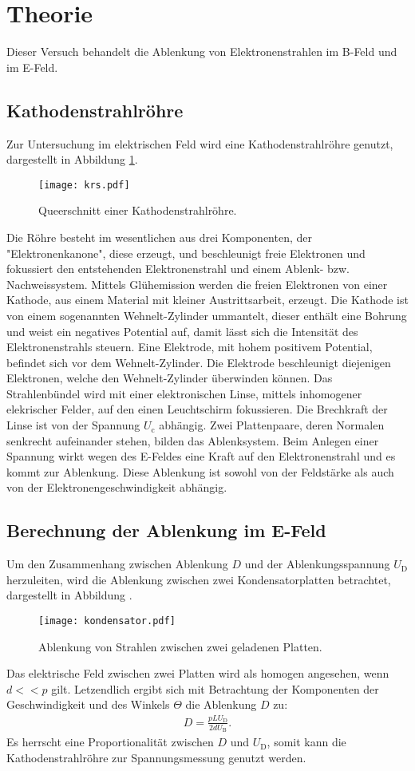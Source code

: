 \section{Theorie}
\label{sec:Theorie}
Dieser Versuch behandelt die Ablenkung von Elektronenstrahlen im B-Feld und
im E-Feld.
\subsection{Kathodenstrahlröhre}
Zur Untersuchung im elektrischen Feld wird eine Kathodenstrahlröhre genutzt,
dargestellt in Abbildung \ref{fig:krs}.
\begin{figure}
 \centering
 \texttt{[image: krs.pdf]}
 \caption{Queerschnitt einer Kathodenstrahlröhre.}
 \label{fig:krs}
\end{figure}
Die Röhre besteht im wesentlichen aus drei Komponenten, der "Elektronenkanone",
diese erzeugt, und beschleunigt freie Elektronen und
fokussiert den entstehenden Elektronenstrahl und einem
Ablenk- bzw. Nachweissystem.
Mittels Glühemission werden die freien Elektronen von einer Kathode, aus
einem Material mit kleiner Austrittsarbeit, erzeugt.
Die Kathode ist von einem sogenannten Wehnelt-Zylinder ummantelt, dieser enthält
eine Bohrung und weist ein negatives Potential auf, damit lässt sich die
Intensität des Elektronenstrahls steuern.
Eine Elektrode, mit hohem positivem Potential, befindet sich
vor dem Wehnelt-Zylinder. Die Elektrode beschleunigt diejenigen Elektronen,
welche den Wehnelt-Zylinder überwinden können.
Das Strahlenbündel wird mit einer elektronischen Linse, mittels
inhomogener elekrischer Felder, auf den einen Leuchtschirm fokussieren.
Die Brechkraft der Linse ist von  der Spannung $U_\mathrm{c}$ abhängig.
Zwei Plattenpaare, deren Normalen senkrecht aufeinander stehen, bilden
das Ablenksystem. Beim Anlegen einer Spannung wirkt wegen des E-Feldes
eine Kraft auf den Elektronenstrahl und es kommt zur Ablenkung.
Diese Ablenkung ist sowohl von der Feldstärke als auch von der
Elektronengeschwindigkeit abhängig.

\subsection{Berechnung der Ablenkung im E-Feld}
Um den Zusammenhang zwischen Ablenkung $D$ und der Ablenkungsspannung
$U_\mathrm{D}$ herzuleiten, wird die Ablenkung zwischen zwei
Kondensatorplatten betrachtet, dargestellt in Abbildung \label{fig:platte}.
\begin{figure}
 \centering
 \texttt{[image: kondensator.pdf]}
 \caption{Ablenkung von Strahlen zwischen zwei geladenen Platten.}
 \label{fig:kondensator}
\end{figure}
Das elektrische Feld zwischen zwei Platten wird als homogen angesehen, wenn
$d<<p$ gilt.
Letzendlich ergibt sich mit Betrachtung der Komponenten der Geschwindigkeit
und des Winkels $\Theta$ die Ablenkung $D$ zu:
\begin{align}
 D=\frac{pLU_\mathrm{D}}{2dU_\mathrm{B}}.
\end{align}
Es herrscht eine Proportionalität zwischen $D$ und $U_\mathrm{D}$,
somit kann die Kathodenstrahlröhre zur Spannungsmessung genutzt werden.
